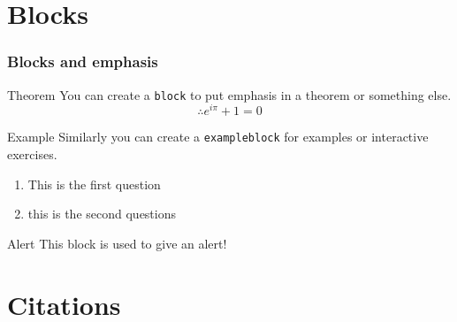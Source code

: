 \documentclass[
    10pt,
    aspectratio=169,
    xcolor={dvipsnames},
    spanish,
    ]{beamer}
\begin{document}
\section{Blocks}

\begin{frame}
  \frametitle{Blocks and emphasis}
  \begin{block}{Theorem}
    You can create a \texttt{block} to put emphasis in a theorem or something else.
    \begin{equation*}
      \therefore e^{i\pi} + 1 = 0
    \end{equation*}
  \end{block}

  \begin{exampleblock}{Example}
    Similarly you can create a \texttt{exampleblock} for examples or interactive exercises.
    \begin{enumerate}
      \item This is the first question
      \item this is the second questions
    \end{enumerate}
  \end{exampleblock}

  \begin{alertblock}{Alert}
    This block is used to give an alert!
  \end{alertblock}
\end{frame}

\section{Citations}
\end{document}
